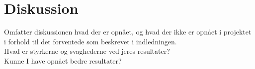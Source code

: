 \chapter{Diskussion}
Omfatter diskussionen hvad der er opnået, og hvad der ikke er opnået i projektet i forhold til det forventede som beskrevet i indledningen. \\
Hvad er styrkerne og svaghederne ved jeres resultater?\\
Kunne I have opnået bedre resultater?\\